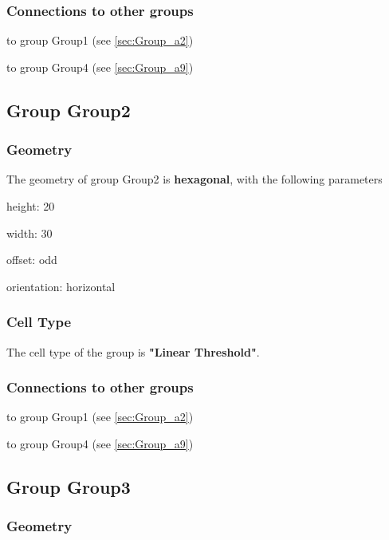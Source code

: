 \documentclass[a4paper, 11pt]{article}
\begin{document}
\subsubsection*{Connections to other groups}
\begin{compactenum}
\item to group Group1 (see \ref{sec:Group_a2})
\item to group Group4 (see \ref{sec:Group_a9})
\end{compactenum}

\subsection{Group Group2}
\label{sec:Group_a7}

\subsubsection*{Geometry}

The geometry of group Group2 is \textbf{hexagonal}, with
the following parameters
\begin{compactitem}
    \item height: 20
    \item width: 30
    \item offset: odd
    \item orientation: horizontal
\end{compactitem}

\subsubsection*{Cell Type}
The cell type of the group is \textbf{"Linear Threshold"}.

\subsubsection*{Connections to other groups}
\begin{compactenum}
\item to group Group1 (see \ref{sec:Group_a2})
\item to group Group4 (see \ref{sec:Group_a9})
\end{compactenum}

\subsection{Group Group3}
\label{sec:Group_a8}

\subsubsection*{Geometry}
\end{document}
